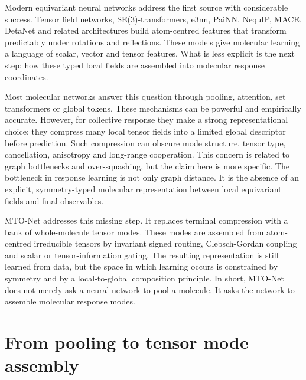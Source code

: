 \documentclass[11pt]{article}
\begin{document}
Modern equivariant neural networks address the first source with considerable success. Tensor field networks, SE(3)-transformers, e3nn, PaiNN, NequIP, MACE, DetaNet and related architectures build atom-centred features that transform predictably under rotations and reflections\citep{Thomas2018TFN,Fuchs2020SE3Transformer,Geiger2023e3nn,Schutt2021PaiNN,Batzner2022NequIP,Batatia2022MACE,Liao2023Equiformer,Zou2023DetaNet}. These models give molecular learning a language of scalar, vector and tensor features. What is less explicit is the next step: how these typed local fields are assembled into molecular response coordinates.

Most molecular networks answer this question through pooling, attention, set transformers or global tokens\citep{Zaheer2017DeepSets,Lee2019SetTransformer}. These mechanisms can be powerful and empirically accurate. However, for collective response they make a strong representational choice: they compress many local tensor fields into a limited global descriptor before prediction. Such compression can obscure mode structure, tensor type, cancellation, anisotropy and long-range cooperation. This concern is related to graph bottlenecks and over-squashing, but the claim here is more specific\citep{Alon2021Bottleneck,Topping2022OverSquashing}. The bottleneck in response learning is not only graph distance. It is the absence of an explicit, symmetry-typed molecular representation between local equivariant fields and final observables.

MTO-Net addresses this missing step. It replaces terminal compression with a bank of whole-molecule tensor modes. These modes are assembled from atom-centred irreducible tensors by invariant signed routing, Clebsch-Gordan coupling and scalar or tensor-information gating. The resulting representation is still learned from data, but the space in which learning occurs is constrained by symmetry and by a local-to-global composition principle. In short, MTO-Net does not merely ask a neural network to pool a molecule. It asks the network to assemble molecular response modes.

\section*{From pooling to tensor mode assembly}
\end{document}
